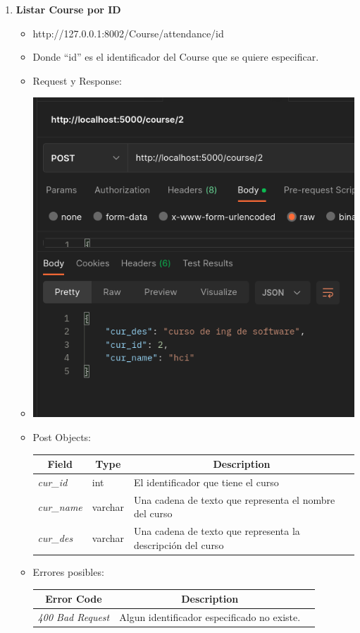 \documentclass{article}
\begin{document}
\begin{enumerate}
    \item \textbf{Listar Course por ID}
    \begin{itemize}
        \item http://127.0.0.1:8002/Course/attendance/id
        \item Donde ``id'' es el identificador del Course que se quiere
        especificar.
        \item Request y Response:
        \item \includegraphics[scale=.5]{assets/course/course2.png}
        \item Post Objects:
        \begin{table}[H] \centering \begin{tabular}{|l|l|l|} \hline
        \multicolumn{1}{|c|}{\textbf{Field}} &
        \multicolumn{1}{c|}{\textbf{Type}} &
        \multicolumn{1}{c|}{\textbf{Description}} \\ \hline \textit{cur\_id} &
        int & El identificador que tiene el curso \\ \hline \textit{cur\_name} &
        varchar & Una cadena de texto que representa el nombre del curso \\
        \hline \textit{cur\_des} & varchar & Una cadena de texto que representa
        la descripción del curso \\ \hline \end{tabular} \end{table}
        \item Errores posibles:
        \begin{table}[H] \centering \begin{tabular}{|c|c|l|} \hline \textbf{Error Code} & \textbf{Description}
        \\ \hline \textit{400 Bad Request} & Algun identificador especificado
        no existe. \\ \hline \end{tabular} \end{table}
    \end{itemize}


\end{enumerate}
\end{document}
